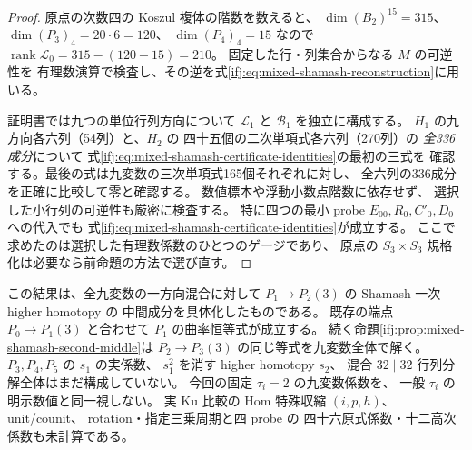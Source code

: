 \begin{proof}
原点の次数四の Koszul 複体の階数を数えると、
$\dim(B_2)^{15}=315$、
$\dim(P_3)_4=20\cdot6=120$、
$\dim(P_4)_4=15$ なので
$\operatorname{rank}\mathcal L_0=315-(120-15)=210$。
固定した行・列集合からなる $M$ の可逆性を
有理数演算で検査し、その逆を式\eqref{ifj:eq:mixed-shamash-reconstruction}に用いる。

証明書では九つの単位行列方向について
$\mathcal L_1$ と $\mathcal B_1$ を独立に構成する。
$H_1$ の九方向各六列（54列）と、$H_2$ の
四十五個の二次単項式各六列（270列）の
\emph{全336成分}について
式\eqref{ifj:eq:mixed-shamash-certificate-identities}の最初の三式を
確認する。最後の式は九変数の三次単項式165個それぞれに対し、
全六列の336成分を正確に比較して零と確認する。
数値標本や浮動小数点階数に依存せず、
選択した小行列の可逆性も厳密に検査する。
特に四つの最小 probe $E_{00},R_0,C'_0,D_0$ への代入でも
式\eqref{ifj:eq:mixed-shamash-certificate-identities}が成立する。
ここで求めたのは選択した有理数係数のひとつのゲージであり、
原点の $S_3\times S_3$ 規格化は必要なら前命題の方法で選び直す。
\end{proof}

\begin{remark}[現行の到達範囲]
この結果は、全九変数の一方向混合に対して
$P_1\to P_2(3)$ の Shamash 一次 higher homotopy の
中間成分を具体化したものである。
既存の端点 $P_0\to P_1(3)$ と合わせて
$P_1$ の曲率恒等式が成立する。
続く命題\ref{ifj:prop:mixed-shamash-second-middle}は
$P_2\to P_3(3)$ の同じ等式を九変数全体で解く。
$P_3,P_4,P_5$ の $s_1$ の実係数、
$s_1^2$ を消す higher homotopy $s_2$、
混合 $32\mid32$ 行列分解全体はまだ構成していない。
今回の固定 $\tau_i=2$ の九変数係数を、
一般 $\tau_i$ の明示数値と同一視しない。
実 Ku 比較の Hom 特殊収縮 $(i,p,h)$、unit/counit、
rotation・指定三乗周期と四 probe の
四十六原式係数・十二高次係数も未計算である。
\end{remark}
